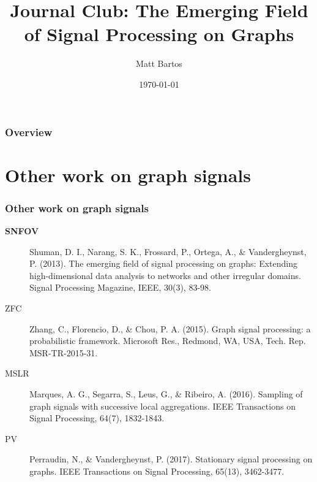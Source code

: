 \documentclass{beamer}
\title[Signal Processing on Graphs]{Journal Club: The Emerging Field of Signal Processing on Graphs} %
\author{Matt Bartos} %
\institute[UM] %
{
University of Michigan \\ %
\medskip
\textit{mdbartos@umich.edu} %
}
\date{\today} %
\begin{document}
\begin{frame}
\titlepage %
\end{frame}

\begin{frame}
\frametitle{Overview} %
\tableofcontents %
\end{frame}


\section{Other work on graph signals} %

\begin{frame}
\frametitle{Other work on graph signals}

\begin{description}
\item[\textbf{SNFOV}] Shuman, D. I., Narang, S. K., Frossard, P., Ortega, A., \&
  Vandergheynst, P. (2013). The emerging field of signal processing on graphs:
  Extending high-dimensional data analysis to networks and other irregular
  domains. Signal Processing Magazine, IEEE, 30(3), 83-98.

\item[ZFC] Zhang, C., Florencio, D., \& Chou, P. A. (2015). Graph signal processing: a
  probabilistic framework. Microsoft Res., Redmond, WA, USA, Tech. Rep.
  MSR-TR-2015-31.

\item[MSLR] Marques, A. G., Segarra, S., Leus, G., \& Ribeiro, A. (2016). Sampling of
  graph signals with successive local aggregations. IEEE Transactions on Signal
  Processing, 64(7), 1832-1843.

\item[PV] Perraudin, N., \& Vandergheynst, P. (2017). Stationary signal processing on
  graphs. IEEE Transactions on Signal Processing, 65(13), 3462-3477.
\end{description}
\end{frame}
\end{document}
